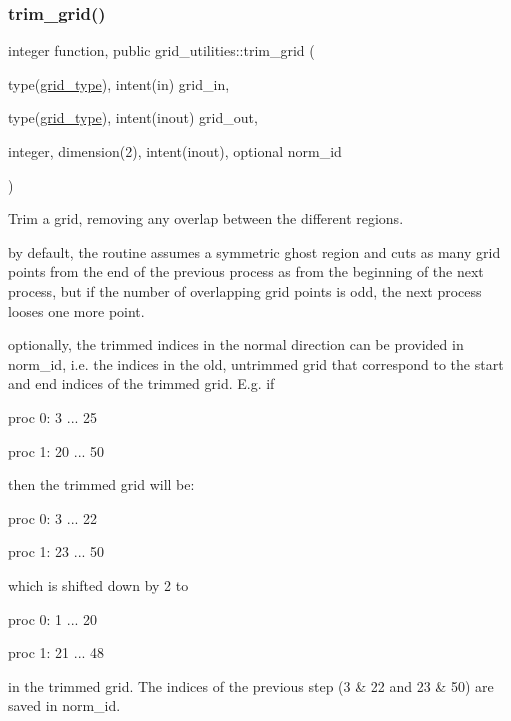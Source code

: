 \subsubsection{\texorpdfstring{trim\+\_\+grid()}{trim\_grid()}}
{\footnotesize\ttfamily integer function, public grid\+\_\+utilities\+::trim\+\_\+grid (\begin{DoxyParamCaption}\item[{type(\hyperlink{structgrid__vars_1_1grid__type}{grid\+\_\+type}), intent(in)}]{grid\+\_\+in,  }\item[{type(\hyperlink{structgrid__vars_1_1grid__type}{grid\+\_\+type}), intent(inout)}]{grid\+\_\+out,  }\item[{integer, dimension(2), intent(inout), optional}]{norm\+\_\+id }\end{DoxyParamCaption})}



Trim a grid, removing any overlap between the different regions. 

by default, the routine assumes a symmetric ghost region and cuts as many grid points from the end of the previous process as from the beginning of the next process, but if the number of overlapping grid points is odd, the next process looses one more point.

optionally, the trimmed indices in the normal direction can be provided in {\ttfamily norm\+\_\+id}, i.\+e. the indices in the old, untrimmed grid that correspond to the start and end indices of the trimmed grid. E.\+g. if
\begin{DoxyItemize}
\item proc 0\+: 3 ... 25
\item proc 1\+: 20 ... 50
\end{DoxyItemize}

then the trimmed grid will be\+:
\begin{DoxyItemize}
\item proc 0\+: 3 ... 22
\item proc 1\+: 23 ... 50
\end{DoxyItemize}

which is shifted down by 2 to
\begin{DoxyItemize}
\item proc 0\+: 1 ... 20
\item proc 1\+: 21 ... 48
\end{DoxyItemize}

in the trimmed grid. The indices of the previous step (3 \& 22 and 23 \& 50) are saved in {\ttfamily norm\+\_\+id}.


